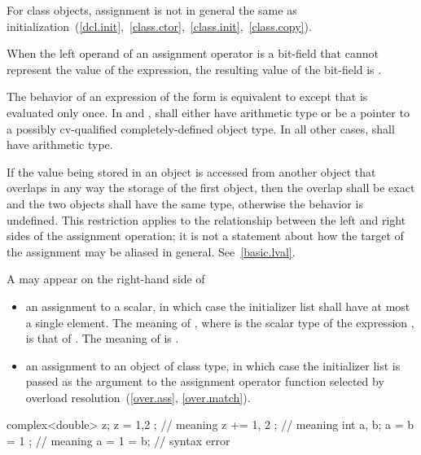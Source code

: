 \pnum
\enternote 
For class objects, assignment is not in general the same as
initialization~(\ref{dcl.init},~\ref{class.ctor},~\ref{class.init},~\ref{class.copy}).
\exitnote 

\pnum
{}%
When the left operand of an assignment operator
is a bit-field that cannot represent the value of the expression, the
resulting value of the bit-field is
.

\pnum
The behavior of an expression of the form  \tcode{=}
 is equivalent to    except
that  is evaluated only once. In \tcode{+=} and \tcode{-=},
 shall either have arithmetic type or be a pointer to a
possibly cv-qualified completely-defined object type. In all other
cases,  shall have arithmetic type.

\pnum
If the value being stored in an object is accessed from another object that
overlaps in any way the storage of the first object, then the overlap shall be
exact and the two objects shall have the same type, otherwise the behavior is
undefined. \enternote This restriction applies to the relationship
between the left and right sides of the assignment operation; it is not a
statement about how the target of the assignment may be aliased in general.
See~\ref{basic.lval}. \exitnote

\pnum
A  may appear on the right-hand side of

\begin{itemize}
\item an assignment to a scalar, in which case the initializer list shall have
at most a single element. The meaning of , where  is the
scalar type of the expression , is that of . The meaning of
 is .

\item an assignment to an object of class type, in which case the initializer
list is passed as the argument to the assignment operator function selected by
overload resolution~(\ref{over.ass}, \ref{over.match}).
\end{itemize}

\enterexample
\begin{codeblock}
complex<double> z;
z = { 1,2 };              // meaning 
z += { 1, 2 };            // meaning 
int a, b;
a = b = { 1 };            // meaning 
a = { 1 } = b;            // syntax error
\end{codeblock}
\exitexample

